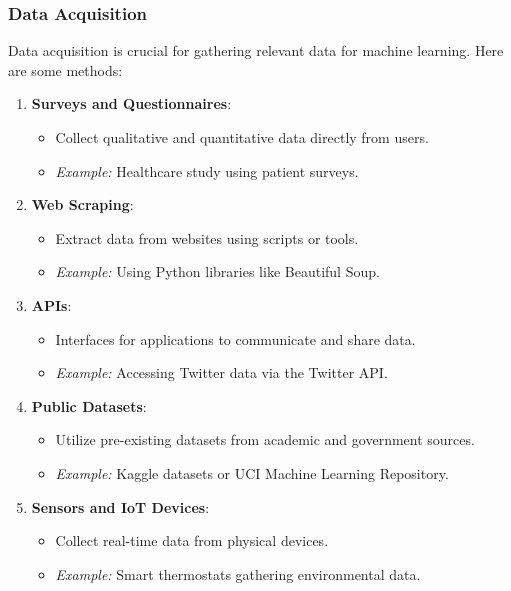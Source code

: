 \documentclass[aspectratio=169]{beamer}
\begin{document}
\begin{frame}[fragile]
    \frametitle{Data Acquisition}
    Data acquisition is crucial for gathering relevant data for machine learning. Here are some methods:
    \begin{enumerate}
        \item \textbf{Surveys and Questionnaires}:
        \begin{itemize}
            \item Collect qualitative and quantitative data directly from users.
            \item \textit{Example:} Healthcare study using patient surveys.
        \end{itemize}

        \item \textbf{Web Scraping}:
        \begin{itemize}
            \item Extract data from websites using scripts or tools.
            \item \textit{Example:} Using Python libraries like Beautiful Soup.
        \end{itemize}

        \item \textbf{APIs}:
        \begin{itemize}
            \item Interfaces for applications to communicate and share data.
            \item \textit{Example:} Accessing Twitter data via the Twitter API.
        \end{itemize}

        \item \textbf{Public Datasets}:
        \begin{itemize}
            \item Utilize pre-existing datasets from academic and government sources.
            \item \textit{Example:} Kaggle datasets or UCI Machine Learning Repository.
        \end{itemize}

        \item \textbf{Sensors and IoT Devices}:
        \begin{itemize}
            \item Collect real-time data from physical devices.
            \item \textit{Example:} Smart thermostats gathering environmental data.
        \end{itemize}
    \end{enumerate}
\end{frame}
\end{document}
